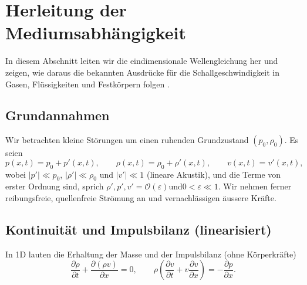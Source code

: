 %
%
%
%
\section{Herleitung der Mediumsabhängigkeit
\label{schall:section:teil1}}


In diesem Abschnitt leiten wir die eindimensionale Wellengleichung her
und zeigen, wie daraus die bekannten Ausdrücke für die Schallgeschwindigkeit
in Gasen, Flüssigkeiten und Festkörpern folgen
\cite{schall:kinsler,schall:landaulifschitz}.

\subsection{Grundannahmen}
Wir betrachten kleine Störungen um einen ruhenden Grundzustand $(p_0,\rho_0)$.
Es seien
\[
    p(x,t)=p_0+p'(x,t),\qquad \rho(x,t)=\rho_0+\rho'(x,t),\qquad v(x,t)=v'(x,t),
\]
wobei $|p'|\ll p_0$, $|\rho'|\ll \rho_0$ und $|v'|\ll 1$ (lineare Akustik),
und die Terme von erster Ordnung sind, sprich
$\rho',p',v' = \mathcal{O}(\varepsilon) \text{und} 0<\varepsilon\ll 1$.
Wir nehmen ferner reibungsfreie, quellenfreie Strömung an und
vernachlässigen äussere Kräfte.


\subsection{Kontinuität und Impulsbilanz (linearisiert)}
In 1D lauten die Erhaltung der Masse und der Impulsbilanz (ohne Körperkräfte)
\begin{equation}
\frac{\partial \rho}{\partial t}+\frac{\partial(\rho v)}{\partial x}=0,
\qquad
\rho\!\left(\frac{\partial v}{\partial t}+v\frac{\partial v}{\partial x}\right)=-\frac{\partial p}{\partial x}.
\label{eq:exact-cont-mom}
\end{equation}

